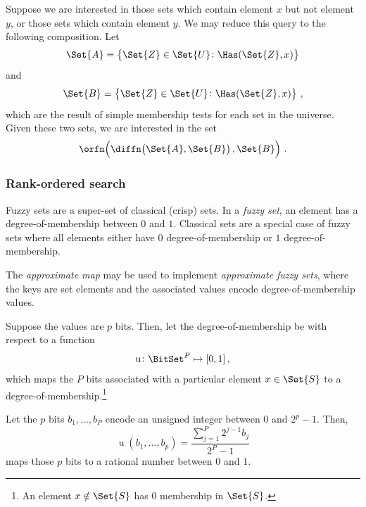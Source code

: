 \documentclass[ ../main.tex]{subfiles}
\begin{document}
\begin{example}
Suppose we are interested in those sets which contain element $x$ but not element $y$, or those sets which contain element $y$. We may reduce this query to the following composition. Let
\begin{equation*}
    \Set{A} = \left\{ \Set{Z} \in \Set{U} \colon \Has(\Set{Z}, x) \right\}
\end{equation*}
and
\begin{equation*}
    \Set{B} = \left\{ \Set{Z} \in \Set{U} \colon \Has(\Set{Z}, x) \right\}\,,
\end{equation*}
which are the result of simple membership tests for each set in the universe. Given these two sets, we are interested in the set
\begin{equation*}
    \orfn\!\left(\diffn\!\left(\Set{A}, \Set{B}\right), \Set{B}\right)\,.
\end{equation*}
\end{example}

\subsubsection{Rank-ordered search}
\label{sec:extensions:fuzzyset}
Fuzzy sets are a super-set of  classical (crisp) sets. In a \emph{fuzzy set}, an element has a degree-of-membership between $0$ and $1$. Classical sets are a special case of fuzzy sets where all elements either have $0$ degree-of-membership or $1$ degree-of-membership.

The \emph{approximate map} may be used to implement \emph{approximate fuzzy sets}, where the keys are set elements and the associated values encode degree-of-membership values.

Suppose the values are $p$ bits. Then, let the degree-of-membership be with respect to a function
\begin{equation}
    \operatorname{u} \colon \BitSet^P \mapsto [0,1]\,,
\end{equation}
which maps the $P$ bits associated with a particular element $x \in \Set{S}$ to a degree-of-membership.\footnote{An element $x \notin \Set{S}$ has $0$ membership in $\Set{S}$.}
\begin{example}
Let the $p$ bits $b_1, \ldots, b_P$ encode an unsigned integer between $0$ and $2^p-1$. Then,
\begin{equation}
    \operatorname{u}\!\left(b_1, \ldots, b_p\right) = \frac{\sum_{j=1}^{P} 2^{j-1} b_j}{2^P-1}
\end{equation}
maps those $p$ bits to a rational number between $0$ and $1$.
\end{example}
\end{document}
